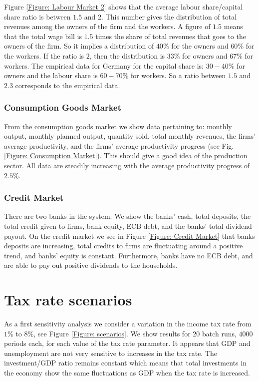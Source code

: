Figure \ref{Figure: Labour Market 2} shows that the average labour share/capital share ratio is between $1.5$ and $2$. This number gives the distribution of total revenues among the owners of the firm and the workers. A figure of $1.5$ means that the total wage bill is $1.5$ times the share of total revenues that goes to the owners of the firm. So it implies a distribution of $40\%$ for the owners and $60\%$ for the workers. If the ratio is $2$, then the distribution is $33\%$ for owners and $67\%$ for workers. The empirical data for Germany for the capital share is: $30-40\%$ for owners and the labour share is $60-70\%$ for workers. So a ratio between $1.5$ and $2.3$ corresponds to the empirical data.

\subsubsection*{Consumption Goods Market}
From the consumption goods market we show data pertaining to: monthly output, monthly planned output, quantity sold, total monthly revenues,
the firms' average productivity, and the firms' average productivity progress (see Fig. \ref{Figure: Consumption Market}). This should give a good idea of the production sector.
All data are steadily increasing with the average productivity progress of $2.5\%$.

\subsubsection*{Credit Market}
There are two banks in the system. 
We show the banks' cash, total deposits, the total credit given to firms, bank equity, ECB debt, and the banks' total dividend payout.
On the credit market we see in Figure \ref{Figure: Credit Market} that banks deposits are increasing, total credits to firms are fluctuating around a positive trend, and banks' equity is constant. Furthermore, banks have no ECB debt, and are able to pay out positive dividends to the households.


\section{Tax rate scenarios}
As a first sensitivity analysis we consider a variation in the income tax rate from $1\%$ to $8\%$, see Figure \ref{Figure: scenarios}.
We show results for $20$ batch runs, $4000$ periods each, for each value of the tax rate parameter.
It appears that GDP and unemployment are not very sensitive to increases in the tax rate.
The investment/GDP ratio remains constant which means that total investments in the economy show the same fluctuations as GDP when the tax rate is increased.




%


